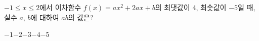 $-1\le x\le 2$에서 이차함수 $f(x)=ax^2+2ax+b$의 최댓값이 4, 최솟값이 $-5$일 때, 실수 $a$, $b$에 대하여 $ab$의 값은? 
\begin{choices32}{$-1$}{$-2$}{$-3$}{$-4$}{$-5$}\end{choices32}
